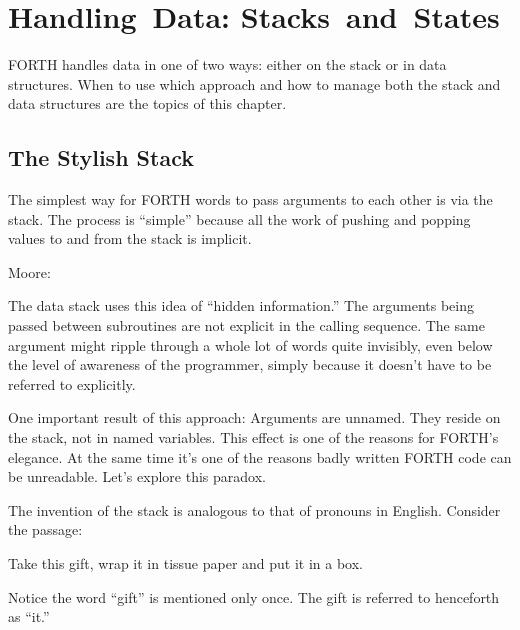 

\chapter{Handling~Data: Stacks~and~States}

FORTH handles data in one of two ways: either on the stack or in data
structures. When to use which approach and how to manage both the
stack and data structures are the topics of this chapter.

\section{The Stylish Stack}

The simplest way for FORTH words to pass arguments to each other is
via the stack. The process is ``simple'' because all the work of pushing
and popping values to and from the stack is implicit.

\bigskip\blackline{2ex}
\noindent Moore:

\begin{tfquot}
The data stack uses this idea of ``hidden information.'' The arguments
being passed between subroutines are not explicit in the calling sequence.
The same argument might ripple through a whole lot of words quite invisibly,
even below the level of awareness of the programmer, simply because it
doesn't have to be referred to explicitly.
\end{tfquot}
\blackline{1ex}

One important result of this approach: Arguments are unnamed. They
reside on the stack, not in named variables. This effect is one of the
reasons for FORTH's elegance. At the same time it's one of the reasons
badly written FORTH code can be unreadable. Let's explore this
paradox.

The invention of the stack is analogous to that of pronouns in
English. Consider the passage:

\begin{tfquot}
Take this gift, wrap it in tissue paper and put it in a box.
\end{tfquot}
Notice the word ``gift'' is mentioned only once. The gift is referred to
henceforth as ``it.''

